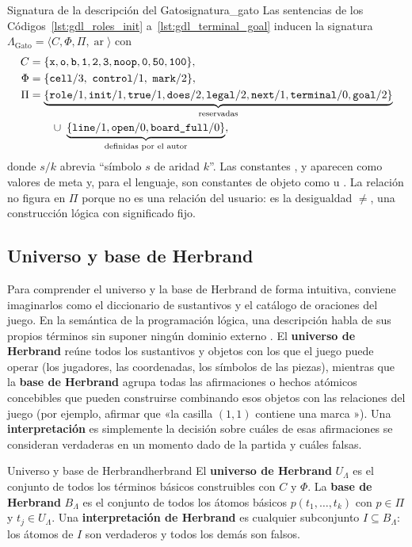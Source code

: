 \begin{ejemplo}{Signatura de la descripción del Gato}{signatura_gato}
Las sentencias de los Códigos~\ref{lst:gdl_roles_init} a~\ref{lst:gdl_terminal_goal} inducen la signatura $\Lambda_{\text{Gato}} = \langle C, \Phi, \Pi, \operatorname{ar} \rangle$ con
\begin{align*}
    C &= \{\texttt{x}, \texttt{o}, \texttt{b}, \texttt{1}, \texttt{2}, \texttt{3}, \texttt{noop}, \texttt{0}, \texttt{50}, \texttt{100}\},\\
    \Phi &= \{\texttt{cell}/3,\ \texttt{control}/1,\ \texttt{mark}/2\},\\
    \Pi &= \underbrace{\{\texttt{role}/1, \texttt{init}/1, \texttt{true}/1, \texttt{does}/2, \texttt{legal}/2, \texttt{next}/1, \texttt{terminal}/0, \texttt{goal}/2\}}_{\text{reservadas}}\\
    &\qquad \cup\; \underbrace{\{\texttt{line}/1, \texttt{open}/0, \texttt{board\_full}/0\}}_{\text{definidas por el autor}},
\end{align*}
donde $s/k$ abrevia ``símbolo $s$ de aridad $k$''. Las constantes ,  y  aparecen como valores de meta y, para el lenguaje, son constantes de objeto como  u . La relación  no figura en $\Pi$ porque no es una relación del usuario: es la desigualdad $\neq$, una construcción lógica con significado fijo.
\end{ejemplo}

\subsection{Universo y base de Herbrand}

Para comprender el universo y la base de Herbrand de forma intuitiva, conviene imaginarlos como el diccionario de sustantivos y el catálogo de oraciones del juego. En la semántica de la programación lógica, una descripción habla de sus propios términos sin suponer ningún dominio externo \cite{Lloyd1987}. El \textbf{universo de Herbrand} reúne todos los sustantivos y objetos con los que el juego puede operar (los jugadores, las coordenadas, los símbolos de las piezas), mientras que la \textbf{base de Herbrand} agrupa todas las afirmaciones o hechos atómicos concebibles que pueden construirse combinando esos objetos con las relaciones del juego (por ejemplo, afirmar que «la casilla $(1,1)$ contiene una marca »). Una \textbf{interpretación} es simplemente la decisión sobre cuáles de esas afirmaciones se consideran verdaderas en un momento dado de la partida y cuáles falsas.

\begin{definicion}{Universo y base de Herbrand}{herbrand}
El \textbf{universo de Herbrand} $U_\Lambda$ es el conjunto de todos los términos básicos construibles con $C$ y $\Phi$. La \textbf{base de Herbrand} $B_\Lambda$ es el conjunto de todos los átomos básicos $p(t_1, \dots, t_k)$ con $p \in \Pi$ y $t_j \in U_\Lambda$. Una \textbf{interpretación de Herbrand} es cualquier subconjunto $I \subseteq B_\Lambda$: los átomos de $I$ son verdaderos y todos los demás son falsos.
\end{definicion}

